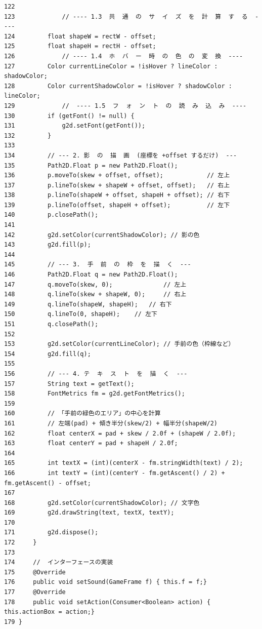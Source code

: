 \documentclass[11pt,a4j]{jarticle}
\begin{document}
\begin{small}
\begin{verbatim}
122 
123             // ---- 1.3  共  通  の  サ  イ  ズ  を  計  算  す  る  ----
124         float shapeW = rectW - offset;
125         float shapeH = rectH - offset;
126             // ---- 1.4  ホ  バ  ー  時  の  色  の  変  換  ----
127         Color currentLineColor = !isHover ? lineColor : shadowColor;
128         Color currentShadowColor = !isHover ? shadowColor : lineColor;
129             //  ---- 1.5  フ  ォ  ン  ト  の  読  み  込  み  ----
130         if (getFont() != null) {
131             g2d.setFont(getFont());
132         }
133 
134         // --- 2. 影  の  描  画  (座標を +offset するだけ)  ---
135         Path2D.Float p = new Path2D.Float();
136         p.moveTo(skew + offset, offset);            // 左上
137         p.lineTo(skew + shapeW + offset, offset);   // 右上
138         p.lineTo(shapeW + offset, shapeH + offset); // 右下
139         p.lineTo(offset, shapeH + offset);          // 左下
140         p.closePath();
141 
142         g2d.setColor(currentShadowColor); // 影の色
143         g2d.fill(p);
144 
145         // --- 3.  手  前  の  枠  を  描  く  ---
146         Path2D.Float q = new Path2D.Float();
147         q.moveTo(skew, 0);              // 左上
148         q.lineTo(skew + shapeW, 0);     // 右上
149         q.lineTo(shapeW, shapeH);   // 右下
150         q.lineTo(0, shapeH);    // 左下
151         q.closePath();
152 
153         g2d.setColor(currentLineColor); // 手前の色（枠線など）
154         g2d.fill(q);
155 
156         // --- 4. テ  キ  ス  ト  を  描  く  ---
157         String text = getText();
158         FontMetrics fm = g2d.getFontMetrics();
159         
160         // 「手前の緑色のエリア」の中心を計算
161         // 左端(pad) + 傾き半分(skew/2) + 幅半分(shapeW/2)
162         float centerX = pad + skew / 2.0f + (shapeW / 2.0f);
163         float centerY = pad + shapeH / 2.0f;
164 
165         int textX = (int)(centerX - fm.stringWidth(text) / 2);
166         int textY = (int)(centerY - fm.getAscent() / 2) + fm.getAscent() - offset;
167         
168         g2d.setColor(currentShadowColor); // 文字色
169         g2d.drawString(text, textX, textY);
170 
171         g2d.dispose();
172     }
173 
174     //  インターフェースの実装
175     @Override
176     public void setSound(GameFrame f) { this.f = f;}
177     @Override
178     public void setAction(Consumer<Boolean> action) { this.actionBox = action;}
179 }
\end{verbatim}
\end{small}
\end{document}
